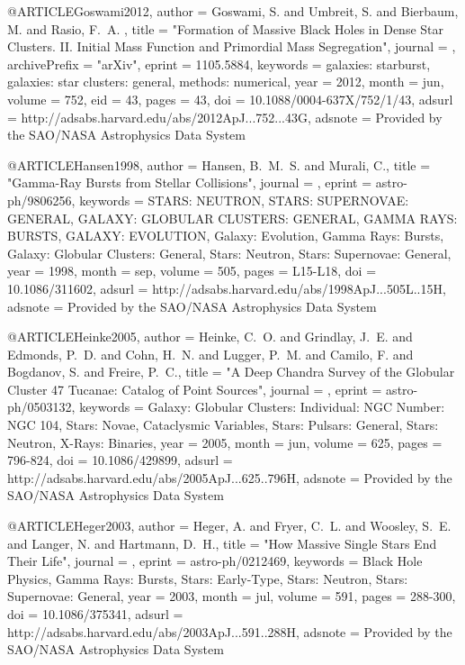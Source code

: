 \documentclass[twocolumn,tighten]{aastex63}
\begin{document}
{{{{{{@ARTICLE{Goswami2012,
   author = {{Goswami}, S. and {Umbreit}, S. and {Bierbaum}, M. and {Rasio}, F.~A.
	},
    title = "{Formation of Massive Black Holes in Dense Star Clusters. II. Initial Mass Function and Primordial Mass Segregation}",
  journal = {\apj},
archivePrefix = "arXiv",
   eprint = {1105.5884},
 keywords = {galaxies: starburst, galaxies: star clusters: general, methods: numerical},
     year = 2012,
    month = jun,
   volume = 752,
      eid = {43},
    pages = {43},
      doi = {10.1088/0004-637X/752/1/43},
   adsurl = {http://adsabs.harvard.edu/abs/2012ApJ...752...43G},
  adsnote = {Provided by the SAO/NASA Astrophysics Data System}
}


@ARTICLE{Hansen1998,
   author = {{Hansen}, B.~M.~S. and {Murali}, C.},
    title = "{Gamma-Ray Bursts from Stellar Collisions}",
  journal = {\apjl},
   eprint = {astro-ph/9806256},
 keywords = {STARS: NEUTRON, STARS: SUPERNOVAE: GENERAL, GALAXY: GLOBULAR CLUSTERS: GENERAL, GAMMA RAYS: BURSTS, GALAXY: EVOLUTION, Galaxy: Evolution, Gamma Rays: Bursts, Galaxy: Globular Clusters: General, Stars: Neutron, Stars: Supernovae: General},
     year = 1998,
    month = sep,
   volume = 505,
    pages = {L15-L18},
      doi = {10.1086/311602},
   adsurl = {http://adsabs.harvard.edu/abs/1998ApJ...505L..15H},
  adsnote = {Provided by the SAO/NASA Astrophysics Data System}
}}

@ARTICLE{Heinke2005,
   author = {{Heinke}, C.~O. and {Grindlay}, J.~E. and {Edmonds}, P.~D. and 
	{Cohn}, H.~N. and {Lugger}, P.~M. and {Camilo}, F. and {Bogdanov}, S. and 
	{Freire}, P.~C.},
    title = "{A Deep Chandra Survey of the Globular Cluster 47 Tucanae: Catalog of Point Sources}",
  journal = {\apj},
   eprint = {astro-ph/0503132},
 keywords = {Galaxy: Globular Clusters: Individual: NGC Number: NGC 104, Stars: Novae, Cataclysmic Variables, Stars: Pulsars: General, Stars: Neutron, X-Rays: Binaries},
     year = 2005,
    month = jun,
   volume = 625,
    pages = {796-824},
      doi = {10.1086/429899},
   adsurl = {http://adsabs.harvard.edu/abs/2005ApJ...625..796H},
  adsnote = {Provided by the SAO/NASA Astrophysics Data System}
}

@ARTICLE{Heger2003,
   author = {{Heger}, A. and {Fryer}, C.~L. and {Woosley}, S.~E. and {Langer}, N. and 
	{Hartmann}, D.~H.},
    title = "{How Massive Single Stars End Their Life}",
  journal = {\apj},
   eprint = {astro-ph/0212469},
 keywords = {Black Hole Physics, Gamma Rays: Bursts, Stars: Early-Type, Stars: Neutron, Stars: Supernovae: General},
     year = 2003,
    month = jul,
   volume = 591,
    pages = {288-300},
      doi = {10.1086/375341},
   adsurl = {http://adsabs.harvard.edu/abs/2003ApJ...591..288H},
  adsnote = {Provided by the SAO/NASA Astrophysics Data System}
}

}}}}}
\end{document}
